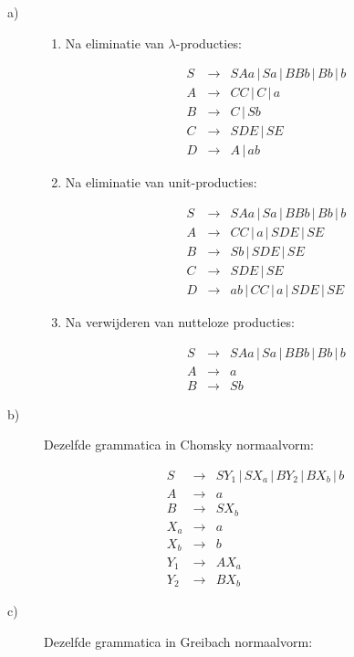 \documentclass[a4paper,11pt]{article}
\begin{document}
\begin{description}


\item[a)]

\begin{enumerate}

\item

Na eliminatie van $\lambda$-producties:

\begin{eqnarray*}
S & \rightarrow & SAa \, | \, Sa \, | \, BBb \, | \, Bb \, | \, b \\
A & \rightarrow & CC \, | \, C \, | \, a \\
B & \rightarrow & C \, | \, Sb \\
C & \rightarrow & SDE \, | \, SE \\
D & \rightarrow & A \, | \, ab
\end{eqnarray*}

\item

Na eliminatie van unit-producties:

\begin{eqnarray*}
S & \rightarrow & SAa \, | \, Sa \, | \, BBb \, | \, Bb \, | \, b \\
A & \rightarrow & CC \, | \, a \, | \, SDE \, | \, SE \\
B & \rightarrow & Sb \, | \, SDE \, | \, SE \\
C & \rightarrow & SDE \, | \, SE \\
D & \rightarrow & ab \, | \, CC \, | \, a \, | \, SDE \, | \, SE
\end{eqnarray*}

\item

Na verwijderen van nutteloze producties:

\begin{eqnarray*}
S & \rightarrow & SAa \, | \, Sa \, | \, BBb \, | \, Bb \, | \, b \\
A & \rightarrow & a \\
B & \rightarrow & Sb
\end{eqnarray*}

\end{enumerate}


\item[b)]

Dezelfde grammatica in Chomsky normaalvorm:

\begin{eqnarray*}
S & \rightarrow & SY_{1} \, | \, SX_{a} \, | \, BY_{2} \, | \, BX_{b} \, | \, b \\
A & \rightarrow & a \\
B & \rightarrow & SX_{b} \\
X_{a} & \rightarrow & a \\
X_{b} & \rightarrow & b \\
Y_{1} & \rightarrow & AX_{a} \\
Y_{2} & \rightarrow & BX_{b}
\end{eqnarray*}


\item[c)]

Dezelfde grammatica in Greibach normaalvorm:


\end{description}
\end{document}
